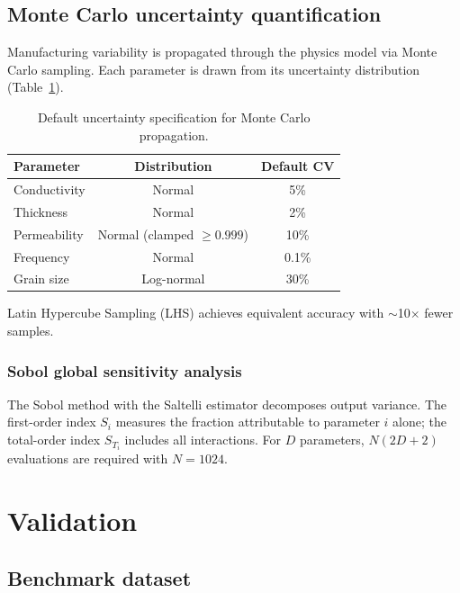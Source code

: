\documentclass[review,3p,authoryear]{elsarticle}
\begin{document}
\subsection{Monte Carlo uncertainty quantification}
\label{sec:mc}

Manufacturing variability is propagated through the physics model via Monte Carlo sampling. Each parameter is drawn from its uncertainty distribution (Table~\ref{tab:uq}).

\begin{table}[htbp]
\centering
\caption{Default uncertainty specification for Monte Carlo propagation.}
\label{tab:uq}
\begin{tabular}{@{}lcc@{}}
\toprule
Parameter & Distribution & Default CV \\
\midrule
Conductivity  & Normal & 5\% \\
Thickness     & Normal & 2\% \\
Permeability  & Normal (clamped $\geq 0.999$) & 10\% \\
Frequency     & Normal & 0.1\% \\
Grain size    & Log-normal & 30\% \\
\bottomrule
\end{tabular}
\end{table}

Latin Hypercube Sampling (LHS) \citep{McKay1979} achieves equivalent accuracy with $\sim$10$\times$ fewer samples.

\subsubsection{Sobol global sensitivity analysis}

The Sobol method \citep{Sobol2001} with the Saltelli estimator \citep{Saltelli2002} decomposes output variance. The first-order index $S_i$ measures the fraction attributable to parameter $i$ alone; the total-order index $S_{T_i}$ includes all interactions. For $D$ parameters, $N(2D+2)$ evaluations are required with $N = 1024$.

\section{Validation}
\label{sec:validation}

\subsection{Benchmark dataset}
\end{document}
